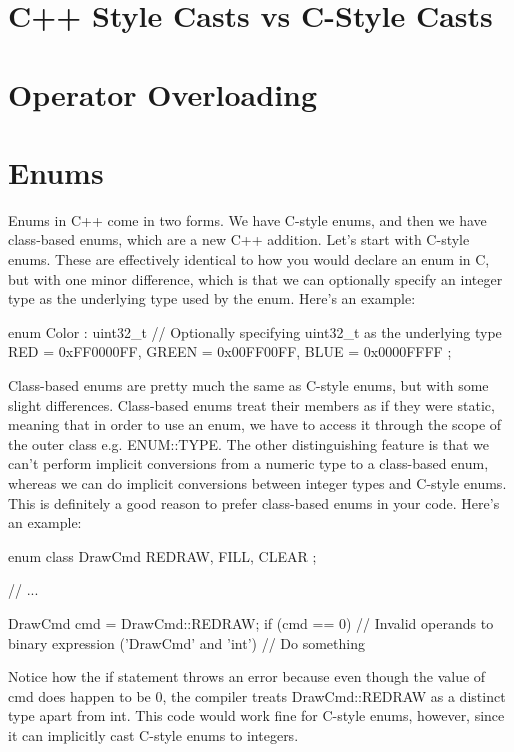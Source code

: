 \documentclass{article}
\begin{document}
\section{C++ Style Casts vs C-Style Casts}

\section{Operator Overloading}

\section{Enums}

Enums in C++ come in two forms. We have C-style enums, and then we have class-based enums, which are a new
C++ addition. Let's start with C-style enums. These are effectively identical to how you would declare an enum
in C, but with one minor difference, which is that we can optionally specify an integer type as the
underlying type used by the enum. Here's an example:

\begin{cpplst}
enum Color : uint32_t // Optionally specifying uint32_t as the underlying type
{
    RED     = 0xFF0000FF,
    GREEN   = 0x00FF00FF,
    BLUE    = 0x0000FFFF
};
\end{cpplst}

Class-based enums are pretty much the same as C-style enums, but with some slight differences. Class-based
enums treat their members as if they were static, meaning that in order to use an enum, we have to access it
through the scope of the outer class e.g. ENUM::TYPE. The other distinguishing feature is that we can't
perform implicit conversions from a numeric type to a class-based enum, whereas we can do implicit conversions
between integer types and C-style enums. This is definitely a good reason to prefer class-based enums in your
code. Here's an example:

\begin{cpplst}
enum class DrawCmd
{
    REDRAW,
    FILL,
    CLEAR
};

// ...

DrawCmd cmd = DrawCmd::REDRAW;
if (cmd == 0) // Invalid operands to binary expression ('DrawCmd' and 'int')
{
    // Do something
}
\end{cpplst}

Notice how the if statement throws an error because even though the value of cmd does happen to be 0, the
compiler treats DrawCmd::REDRAW as a distinct type apart from int. This code would work fine for C-style
enums, however, since it can implicitly cast C-style enums to integers.
\end{document}
